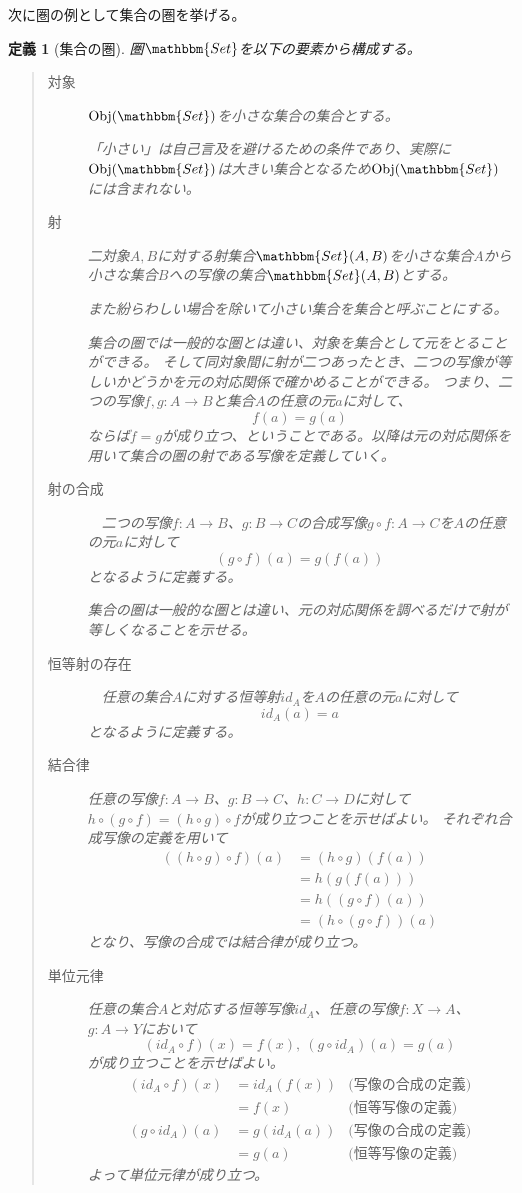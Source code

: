 \documentclass[dvipdfmx]{jsarticle}
\newcommand{\cat}[1]{\mathbbm{#1}}
\newcommand{\arrow}{\rightarrow}
\newcommand{\obj}[1]{\mathrm{Obj}(\cat{#1})}
\newcommand{\mor}[3]{#1:#2\arrow #3}
\newcommand{\arset}[3]{\cat{#1}(#2,#3)}
\newtheorem{define}{定義}[section]
\numberwithin{proof}{subsection}
\numberwithin{prop}{subsection}
\numberwithin{define}{subsection}
\begin{document}
	次に圏の例として集合の圏を挙げる。
	\begin{define}[集合の圏]
		圏$\cat{Set}$を以下の要素から構成する。
		\begin{quote}
			\begin{description}
				\item[対象] $\obj{Set}$を小さな集合の集合とする。

				「小さい」は自己言及を避けるための条件であり、実際に$\obj{Set}$は大きい集合となるため$\obj{Set}$には含まれない。
				\item[射] 二対象$A,B$に対する射集合$\arset{Set}{A}{B}$を小さな集合$A$から小さな集合$B$への写像の集合$\arset{Set}{A}{B}$とする。

				また紛らわしい場合を除いて小さい集合を集合と呼ぶことにする。

				集合の圏では一般的な圏とは違い、対象を集合として元をとることができる。
				そして同対象間に射が二つあったとき、二つの写像が等しいかどうかを元の対応関係で確かめることができる。
				つまり、二つの写像$\mor{f,g}{A}{B}$と集合$A$の任意の元$a$に対して、\[f(a)=g(a)\]ならば$f=g$が成り立つ、ということである。以降は元の対応関係を用いて集合の圏の射である写像を定義していく。

				\item[射の合成] 　二つの写像$\mor{f}{A}{B}$、$\mor{g}{B}{C}$の合成写像$\mor{g\circ f}{A}{C}$を$A$の任意の元$a$に対して\[(g\circ f)(a)=g(f(a))\]となるように定義する。

				集合の圏は一般的な圏とは違い、元の対応関係を調べるだけで射が等しくなることを示せる。
				\item[恒等射の存在]　任意の集合$A$に対する恒等射$id_A$を$A$の任意の元$a$に対して\[id_A(a)=a\]となるように定義する。
				\item[結合律] 任意の写像$\mor{f}{A}{B}$、$\mor{g}{B}{C}$、$\mor{h}{C}{D}$に対して$h\circ(g\circ f)=(h\circ g)\circ f$が成り立つことを示せばよい。
				それぞれ合成写像の定義を用いて
				\begin{align*}
					((h\circ g)\circ f)(a)&=(h\circ g)(f(a))\\
					&=h(g(f(a)))\\
					&=h((g\circ f)(a))\\
					&=(h\circ(g\circ f))(a)
				\end{align*}
				となり、写像の合成では結合律が成り立つ。
				\item[単位元律] 任意の集合$A$と対応する恒等写像$id_A$、任意の写像$\mor{f}{X}{A}$、$\mor{g}{A}{Y}$において\[(id_A\circ f)(x)=f(x),\ (g\circ id_A)(a)=g(a)\]が成り立つことを示せばよい。
				\begin{align*}
					(id_A\circ f)(x)&=id_A(f(x))&\text{(写像の合成の定義)}\\
					&=f(x)&\text{{(恒等写像の定義)}}\\
					(g\circ id_A)(a)&=g(id_A(a))&\text{(写像の合成の定義)}\\
					&=g(a)&\text{{(恒等写像の定義)}}
				\end{align*}
				よって単位元律が成り立つ。
			\end{description}
		\end{quote}
	\end{define}
\end{document}
